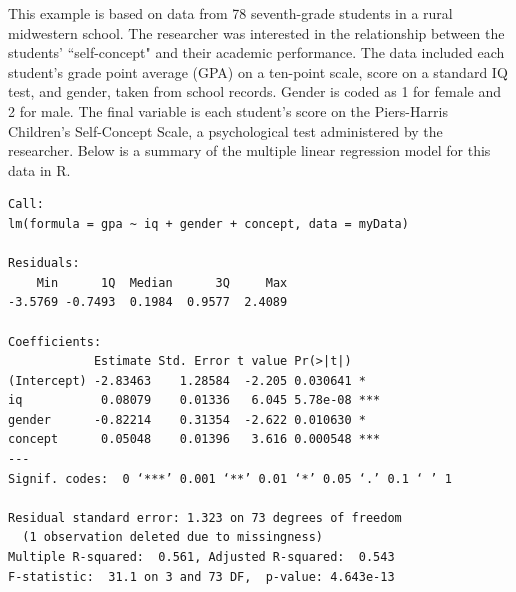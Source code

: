\documentclass[11pt,answers]{exam}
\begin{document}
\begin{questions}
\begin{parts}
\begin{solution}
\begin{tabular}{|l|c|c|c|c|}
\hline
\end{tabular}

\end{solution}

\vfill

\end{parts}


\question This example is based on data from 78 seventh-grade students in a rural midwestern school. The researcher was interested in the relationship between the students' ``self-concept" and their academic performance. The data included each student's grade point average (GPA) on a ten-point scale, score on a standard IQ test, and gender, taken from school records. Gender is coded as 1 for female and 2 for male. The final variable is each student's score on the Piers-Harris Children's Self-Concept Scale, a psychological test administered by the researcher. Below is a summary of the multiple linear regression model for this data in R. 


{\small
\begin{verbatim}
Call:
lm(formula = gpa ~ iq + gender + concept, data = myData)

Residuals:
    Min      1Q  Median      3Q     Max 
-3.5769 -0.7493  0.1984  0.9577  2.4089 

Coefficients:
            Estimate Std. Error t value Pr(>|t|)    
(Intercept) -2.83463    1.28584  -2.205 0.030641 *  
iq           0.08079    0.01336   6.045 5.78e-08 ***
gender      -0.82214    0.31354  -2.622 0.010630 *  
concept      0.05048    0.01396   3.616 0.000548 ***
---
Signif. codes:  0 ‘***’ 0.001 ‘**’ 0.01 ‘*’ 0.05 ‘.’ 0.1 ‘ ’ 1

Residual standard error: 1.323 on 73 degrees of freedom
  (1 observation deleted due to missingness)
Multiple R-squared:  0.561,	Adjusted R-squared:  0.543 
F-statistic:  31.1 on 3 and 73 DF,  p-value: 4.643e-13
\end{verbatim}}


\end{questions}
\end{document}
